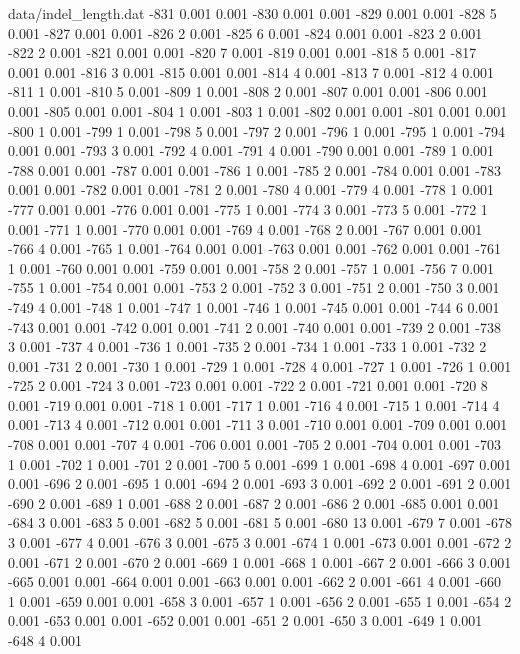 \begin{filecontents}{data/indel_length.dat}
-831	0.001	0.001
-830	0.001	0.001
-829	0.001	0.001
-828	5	0.001
-827	0.001	0.001
-826	2	0.001
-825	6	0.001
-824	0.001	0.001
-823	2	0.001
-822	2	0.001
-821	0.001	0.001
-820	7	0.001
-819	0.001	0.001
-818	5	0.001
-817	0.001	0.001
-816	3	0.001
-815	0.001	0.001
-814	4	0.001
-813	7	0.001
-812	4	0.001
-811	1	0.001
-810	5	0.001
-809	1	0.001
-808	2	0.001
-807	0.001	0.001
-806	0.001	0.001
-805	0.001	0.001
-804	1	0.001
-803	1	0.001
-802	0.001	0.001
-801	0.001	0.001
-800	1	0.001
-799	1	0.001
-798	5	0.001
-797	2	0.001
-796	1	0.001
-795	1	0.001
-794	0.001	0.001
-793	3	0.001
-792	4	0.001
-791	4	0.001
-790	0.001	0.001
-789	1	0.001
-788	0.001	0.001
-787	0.001	0.001
-786	1	0.001
-785	2	0.001
-784	0.001	0.001
-783	0.001	0.001
-782	0.001	0.001
-781	2	0.001
-780	4	0.001
-779	4	0.001
-778	1	0.001
-777	0.001	0.001
-776	0.001	0.001
-775	1	0.001
-774	3	0.001
-773	5	0.001
-772	1	0.001
-771	1	0.001
-770	0.001	0.001
-769	4	0.001
-768	2	0.001
-767	0.001	0.001
-766	4	0.001
-765	1	0.001
-764	0.001	0.001
-763	0.001	0.001
-762	0.001	0.001
-761	1	0.001
-760	0.001	0.001
-759	0.001	0.001
-758	2	0.001
-757	1	0.001
-756	7	0.001
-755	1	0.001
-754	0.001	0.001
-753	2	0.001
-752	3	0.001
-751	2	0.001
-750	3	0.001
-749	4	0.001
-748	1	0.001
-747	1	0.001
-746	1	0.001
-745	0.001	0.001
-744	6	0.001
-743	0.001	0.001
-742	0.001	0.001
-741	2	0.001
-740	0.001	0.001
-739	2	0.001
-738	3	0.001
-737	4	0.001
-736	1	0.001
-735	2	0.001
-734	1	0.001
-733	1	0.001
-732	2	0.001
-731	2	0.001
-730	1	0.001
-729	1	0.001
-728	4	0.001
-727	1	0.001
-726	1	0.001
-725	2	0.001
-724	3	0.001
-723	0.001	0.001
-722	2	0.001
-721	0.001	0.001
-720	8	0.001
-719	0.001	0.001
-718	1	0.001
-717	1	0.001
-716	4	0.001
-715	1	0.001
-714	4	0.001
-713	4	0.001
-712	0.001	0.001
-711	3	0.001
-710	0.001	0.001
-709	0.001	0.001
-708	0.001	0.001
-707	4	0.001
-706	0.001	0.001
-705	2	0.001
-704	0.001	0.001
-703	1	0.001
-702	1	0.001
-701	2	0.001
-700	5	0.001
-699	1	0.001
-698	4	0.001
-697	0.001	0.001
-696	2	0.001
-695	1	0.001
-694	2	0.001
-693	3	0.001
-692	2	0.001
-691	2	0.001
-690	2	0.001
-689	1	0.001
-688	2	0.001
-687	2	0.001
-686	2	0.001
-685	0.001	0.001
-684	3	0.001
-683	5	0.001
-682	5	0.001
-681	5	0.001
-680	13	0.001
-679	7	0.001
-678	3	0.001
-677	4	0.001
-676	3	0.001
-675	3	0.001
-674	1	0.001
-673	0.001	0.001
-672	2	0.001
-671	2	0.001
-670	2	0.001
-669	1	0.001
-668	1	0.001
-667	2	0.001
-666	3	0.001
-665	0.001	0.001
-664	0.001	0.001
-663	0.001	0.001
-662	2	0.001
-661	4	0.001
-660	1	0.001
-659	0.001	0.001
-658	3	0.001
-657	1	0.001
-656	2	0.001
-655	1	0.001
-654	2	0.001
-653	0.001	0.001
-652	0.001	0.001
-651	2	0.001
-650	3	0.001
-649	1	0.001
-648	4	0.001

\end{filecontents}

